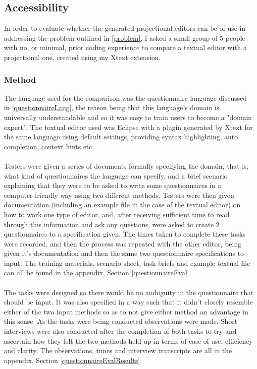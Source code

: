 \documentclass{article}
\begin{document}
\subsection{Accessibility}\label{Accessibility}
In order to evaluate whether the generated projectional editors can be of use in addressing the problem outlined in \ref{problem}, I asked a small group of 5 people with no, or minimal, prior coding experience to compare a textual editor with a projectional one, created using my Xtext extension.

\subsubsection{Method}
The language used for the comparison was the questionnaire language discussed in \ref{questionnaireLang}, the reason being that this language's domain is universally understandable and so it was easy to train users to become a "domain expert". The textual editor used was Eclipse with a plugin generated by Xtext for the same language using default settings, providing syntax highlighting, auto completion, context hints etc.
\\
\\
Testers were given a series of documents formally specifying the domain, that is, what kind of  questionnaires the language can specify, and a brief scenario explaining that they were to be asked to write some questionnaires in a computer-friendly way using two different methods. Testers were then given documentation (including an example file in the case of the textual editor) on how to work one type of editor, and, after receiving sufficient time to read through this information and ask any questions, were asked to create 2 questionnaires to a specification given. The times taken to complete these tasks were recorded, and then the process was repeated with the other editor, being given it's documentation and then the same two questionnaire specifications to input. The training materials, scenario sheet, task briefs and example textual file can all be found in the appendix, Section \ref{questionnaireEval}.
\\
\\
The tasks were designed so there would be no ambiguity in the questionnaire that should be input. It was also specified in a way such that it didn't closely resemble either of the two input methods so as to not give either method an advantage in this sense. As the tasks were being conducted observations were made. Short interviews were also conducted after the completion of both tasks to try and ascertain how they felt the two methods held up in terms of ease of use, efficiency and clarity. The observations, times and interview transcripts are all in the appendix, Section \ref{questionnaireEvalResults}.
\end{document}
